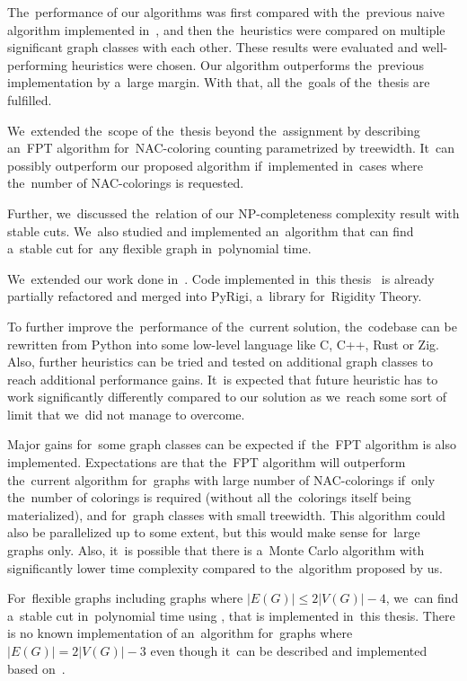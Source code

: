 The~performance of our algorithms was
first compared with the~previous naive algorithm implemented in~\flexrilog{},
and then the~heuristics were compared on multiple significant graph classes
with each other.
%
These results were evaluated and well-performing heuristics were chosen.
Our algorithm outperforms the~previous implementation by a~large margin.
%
With that, all the~goals of the~thesis are fulfilled.

We~extended the~scope of the~thesis beyond the~assignment by
describing an~FPT algorithm for~NAC-coloring counting
parametrized by treewidth.
It~can possibly outperform our proposed algorithm if~implemented
in~cases where the~number of NAC-colorings is requested.

Further, we~discussed the~relation of our NP-completeness complexity result
with stable cuts.
We~also studied and implemented an~algorithm that can find
a~stable cut for~any flexible graph in~polynomial time.

We~extended our work done in~\cite{my_paper}.
Code implemented in~this thesis~\cite{my_code} is already partially
refactored and merged into PyRigi, a~library for~Rigidity Theory.


To further improve the~performance of the~current solution, the~codebase
can be rewritten from Python into some low-level language like C, C++, Rust or Zig.
Also, further heuristics can be tried
and tested on additional graph classes
to reach additional performance gains.
It~is expected that future heuristic has to work significantly differently
compared to our solution as we~reach some sort of limit
that we~did not manage to overcome.

Major gains for~some graph classes
can be expected if~the~FPT algorithm is also implemented.
Expectations are that the~FPT algorithm will outperform the~current algorithm
for~graphs with large number of NAC-colorings if~only the~number of colorings
is required (without all the~colorings itself being materialized),
and for~graph classes with small treewidth.
This algorithm could also be parallelized up to some extent,
but this would make sense for~large graphs only.
%
Also, it~is possible that there is a~Monte Carlo algorithm with significantly
lower time complexity compared to the~algorithm proposed by us.

For~flexible graphs including graphs where \( |E(G)| \le 2|V(G)| - 4 \),
we~can find a~stable cut in~polynomial time using ,
that is implemented in~this thesis.
There is no known implementation of an~algorithm
for~graphs where \( |E(G)| = 2|V(G)| - 3 \)
even though it~can be described and implemented
based on~\cite{stable_cuts_2v_3,stable_cuts_2v_3_revisit}.


